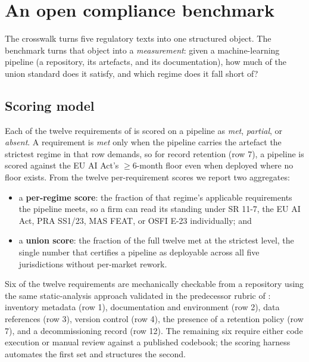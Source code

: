 \section{An open compliance benchmark}\label{sec:benchmark}

The crosswalk turns five regulatory texts into one structured object. The benchmark turns that object into a \emph{measurement}: given a machine-learning pipeline (a repository, its artefacts, and its documentation), how much of the union standard does it satisfy, and which regime does it fall short of?

\subsection{Scoring model}\label{sec:scoring}

Each of the twelve requirements of  is scored on a pipeline as \emph{met}, \emph{partial}, or \emph{absent}. A requirement is \emph{met} only when the pipeline carries the artefact the strictest regime in that row demands, so for record retention (row 7), a pipeline is scored against the EU AI Act's $\geq$6-month floor even when deployed where no floor exists. From the twelve per-requirement scores we report two aggregates:

\begin{itemize}[leftmargin=*]
    \item a \textbf{per-regime score}: the fraction of that regime's applicable requirements the pipeline meets, so a firm can read its standing under SR 11-7, the EU AI Act, PRA SS1/23, MAS FEAT, or OSFI E-23 individually; and
    \item a \textbf{union score}: the fraction of the full twelve met at the strictest level, the single number that certifies a pipeline as deployable across all five jurisdictions without per-market rework.
\end{itemize}

Six of the twelve requirements are mechanically checkable from a repository using the same static-analysis approach validated in the predecessor rubric of \citet{KhanMrAudit2026}: inventory metadata (row 1), documentation and environment (row 2), data references (row 3), version control (row 4), the presence of a retention policy (row 7), and a decommissioning record (row 12). The remaining six require either code execution or manual review against a published codebook; the scoring harness automates the first set and structures the second.


